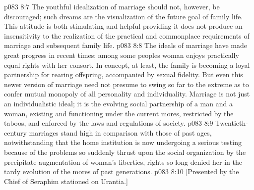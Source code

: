 \vs p083 8:7 The youthful idealization of marriage should not, however, be discouraged; such dreams are the visualization of the future goal of family life. This attitude is both stimulating and helpful providing it does not produce an insensitivity to the realization of the practical and commonplace requirements of marriage and subsequent family life.
\vs p083 8:8 The ideals of marriage have made great progress in recent times; among some peoples woman enjoys practically equal rights with her consort. In concept, at least, the family is becoming a loyal partnership for rearing offspring, accompanied by sexual fidelity. But even this newer version of marriage need not presume to swing so far to the extreme as to confer mutual monopoly of all personality and individuality. Marriage is not just an individualistic ideal; it is the evolving social partnership of a man and a woman, existing and functioning under the current mores, restricted by the taboos, and enforced by the laws and regulations of society.
\vs p083 8:9 Twentieth\hyp{}century marriages stand high in comparison with those of past ages, notwithstanding that the home institution is now undergoing a serious testing because of the problems so suddenly thrust upon the social organization by the precipitate augmentation of woman’s liberties, rights so long denied her in the tardy evolution of the mores of past generations.
\vsetoff
\vs p083 8:10 [Presented by the Chief of Seraphim stationed on Urantia.]

